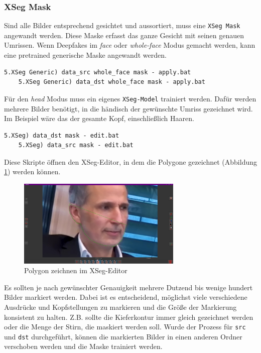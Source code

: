 \subsubsection*{XSeg Mask}
Sind alle Bilder entsprechend gesichtet und aussortiert, muss eine \texttt{XSeg Mask} angewandt werden.
Diese Maske erfasst das ganze Gesicht mit seinen genauen Umrissen.
Wenn Deepfakes im \textit{face} oder \textit{whole-face} Modus gemacht werden, kann eine pretrained generische Maske angewandt werden.
\begin{lstlisting}[label={lst:extraction-5},numbers=none]
    5.XSeg Generic) data_src whole_face mask - apply.bat
    5.XSeg Generic) data_dst whole_face mask - apply.bat
\end{lstlisting}
Für den \textit{head} Modus muss ein eigenes \texttt{XSeg-Model} trainiert werden.
Dafür werden mehrere Bilder benötigt, in die händisch der gewünschte Umriss gezeichnet wird.
Im Beispiel wäre das der gesamte Kopf, einschließlich Haaren.
\begin{lstlisting}[numbers=none,label={lst:extraction-6}]
    5.XSeg) data_dst mask - edit.bat
    5.XSeg) data_src mask - edit.bat
\end{lstlisting}
Diese Skripte öffnen den XSeg-Editor, in dem die Polygone gezeichnet (Abbildung \ref{fig:xseg-editor-1}) werden können.
\begin{figure}
    \center
    \includegraphics[width=0.7\textwidth]{Bilder/DFL/XSegEditor-1-draw}
    \caption{Polygon zeichnen im XSeg-Editor}
    \label{fig:xseg-editor-1}
\end{figure}
Es sollten je nach gewünschter Genauigkeit mehrere Dutzend bis wenige hundert Bilder markiert werden.
Dabei ist es entscheidend, möglichst viele verschiedene Ausdrücke und Kopfstellungen zu markieren und die Größe der Markierung konsistent zu halten.
Z.B. sollte die Kieferkontur immer gleich gezeichnet werden oder die Menge der Stirn, die maskiert werden soll.
Wurde der Prozess für \texttt{src} und \texttt{dst} durchgeführt, können die markierten Bilder in einen anderen Ordner verschoben werden und die Maske trainiert werden.
